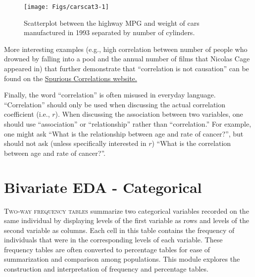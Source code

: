 \documentclass[10pt,openany]{book}\usepackage[]{graphicx}\usepackage[]{color}
\newenvironment{knitrout}{}{} %
\begin{document}
\begin{knitrout}
\color{fgcolor}\begin{figure}[hbtp]

{\centering \texttt{[image: Figs/carscat3-1]} 

}

\caption[Scatterplot between the highway MPG and weight of cars manufactured in 1993 separated by number of cylinders]{Scatterplot between the highway MPG and weight of cars manufactured in 1993 separated by number of cylinders.}\label{fig:carscat3}
\end{figure}


\end{knitrout}

More interesting examples (e.g., high correlation between number of people who drowned by falling into a pool and the annual number of films that Nicolas Cage appeared in) that further demonstrate that ``correlation is not causation'' can be found on the \href{http://www.tylervigen.com/spurious-correlations}{Spurious Correlations website.}

Finally, the word ``correlation'' is often misused in everyday language. ``Correlation'' should only be used when discussing the actual correlation coefficient (i.e., $r$). When discussing the association between two variables, one should use ``association'' or ``relationship'' rather than ``correlation.'' For example, one might ask ``What is the relationship between age and rate of cancer?'', but should not ask (unless specifically interested in $r$) ``What is the correlation between age and rate of cancer?''.



\chapter{Bivariate EDA - Categorical} \label{chap:BivEDACat}

\minitoc
\vspace{60pt}

\lettrine{T}{wo-way frequency tables} summarize two categorical variables recorded on the same individual by displaying levels of the first variable as rows and levels of the second variable as columns. Each cell in this table contains the frequency of individuals that were in the corresponding levels of each variable. These frequency tables are often converted to percentage tables for ease of summarization and comparison among populations. This module explores the construction and interpretation of frequency and percentage tables.
\end{document}
